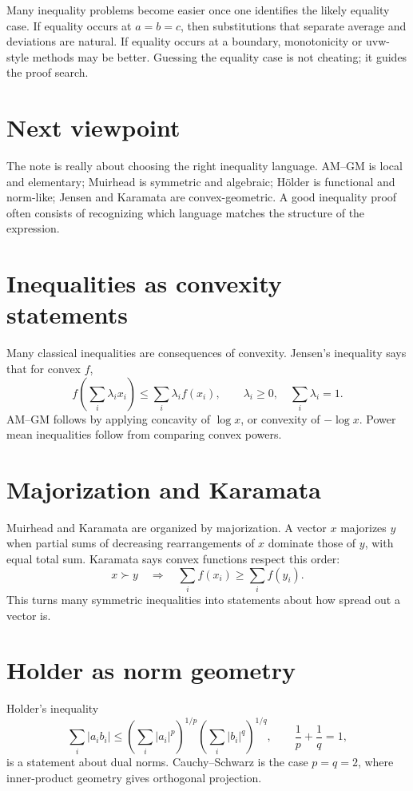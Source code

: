 Many inequality problems become easier once one identifies the likely equality case.  If equality occurs at \(a=b=c\), then substitutions that separate average and deviations are natural.  If equality occurs at a boundary, monotonicity or uvw-style methods may be better.  Guessing the equality case is not cheating; it guides the proof search.

\section{Next viewpoint}

The note is really about choosing the right inequality language.  AM--GM is local and elementary; Muirhead is symmetric and algebraic; Hölder is functional and norm-like; Jensen and Karamata are convex-geometric.  A good inequality proof often consists of recognizing which language matches the structure of the expression.

\section{Inequalities as convexity statements}

Many classical inequalities are consequences of convexity.  Jensen's inequality says that for convex \(f\),
\[
  f\left(\sum_i \lambda_i x_i\right)\le \sum_i \lambda_i f(x_i),\qquad \lambda_i\ge0,\quad \sum_i\lambda_i=1.
\]
AM--GM follows by applying concavity of \(\log x\), or convexity of \(-\log x\).  Power mean inequalities follow from comparing convex powers.

\section{Majorization and Karamata}

Muirhead and Karamata are organized by majorization.  A vector \(x\) majorizes \(y\) when partial sums of decreasing rearrangements of \(x\) dominate those of \(y\), with equal total sum.  Karamata says convex functions respect this order:
\[
  x\succ y\quad\Rightarrow\quad \sum_i f(x_i)\ge\sum_i f(y_i).
\]
This turns many symmetric inequalities into statements about how spread out a vector is.

\section{Holder as norm geometry}

Holder's inequality
\[
  \sum_i |a_i b_i|\le \left(\sum_i |a_i|^p\right)^{1/p}\left(\sum_i |b_i|^q\right)^{1/q},\qquad \frac1p+\frac1q=1,
\]
is a statement about dual norms.  Cauchy--Schwarz is the case \(p=q=2\), where inner-product geometry gives orthogonal projection.

